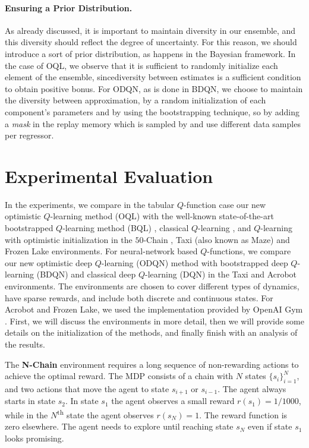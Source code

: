   
\paragraph{Ensuring a Prior Distribution.} As already discussed, it is important to maintain diversity in our ensemble, and this diversity should reflect the degree of uncertainty. For this reason, we should introduce a sort of prior distribution, as happens in the Bayesian framework. In the case of OQL, we observe that it is sufficient to randomly initialize each element of the ensemble, sincediversity between estimates is a sufficient condition to obtain positive bonus. 
For ODQN, as is done in BDQN, we choose to maintain the diversity between approximation, by a random initialization of each component's parameters and by using the bootstrapping technique, so by adding a \textsl{mask} in the replay memory which is sampled by  and use different data samples per regressor. 
  
  
\section{Experimental Evaluation}
\label{sec:experiments}

In the experiments, we compare in the tabular $Q$-function case our new optimistic $Q$-learning method (OQL) with the well-known state-of-the-art bootstrapped $Q$-learning method (BQL) \cite{osband2016deep}, classical $Q$-learning \cite{watkins1992q}, and $Q$-learning with optimistic initialization \cite{sutton1998reinforcement} in the $50$-Chain \cite{osband2016deep}, Taxi (also known as Maze) \cite{dearden1998bayesian} and Frozen Lake \cite{brockman2016openai} environments. For neural-network based $Q$-functions, we compare our new optimistic deep $Q$-learning (ODQN) method with bootstrapped deep $Q$-learning (BDQN) and classical deep $Q$-learning (DQN) in the Taxi and Acrobot \cite{sutton1996generalization} environments.
The environments are chosen to cover different types of dynamics, have sparse rewards, and include both discrete and continuous states. For Acrobot and Frozen Lake, we used the implementation provided by OpenAI Gym \cite{brockman2016openai}. First, we will discuss the environments in more detail, then we will provide some details on the
initialization of the methods, and finally finish with an analysis of the results.

The \textbf{N-Chain} environment \cite{osband2016deep} requires a long sequence of non-rewarding actions to achieve the optimal reward. The MDP consists of a chain with $N$ states $\{s_i\}_{i=1}^N$, and two actions that move the agent to state $s_{i+1}$ or $s_{i-1}$. The agent always starts in state $s_2$. In state $s_1$ the agent observes a small reward $r(s_1)=1/1000$, while in the $N$\textsuperscript{th} state the agent observes $r(s_N) = 1$. The reward function is zero elsewhere. The agent needs to explore until reaching state $s_N$ even if state $s_1$ looks promising.


